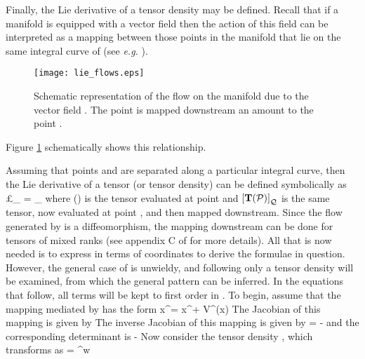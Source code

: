 Finally, the Lie derivative of a tensor density may be defined.
Recall that if a manifold is equipped with a vector field then the action of this
field can be interpreted as a mapping between those points in the manifold that
lie on the same integral curve of  (see \textit{e.g.} ).
\begin{figure}
\centerline{
   \texttt{[image: lie\_flows.eps]}}
   \caption{Schematic representation of the flow on the manifold \mM \nudge due to
   the vector field .  The point \mP \nudge is mapped downstream an amount
   \gl to the point \mQ.}\label{fig:D1}
\end{figure}
Figure \ref{fig:D1} schematically shows this relationship.

Assuming that points \mP \push and \mQ \push are separated along a particular integral curve,
then the Lie derivative of a tensor (or tensor density) can be defined symbolically
as
\be\label{eq:D12}
  \pounds_{}  = \lim_{\gl {}}
                            \frac
                              {}
                              {\gl} \eqc
\ee
where (\mQ) is the tensor evaluated at point \mQ \push and $\left[ {\mathbf{{T}}(\mathcal P)} \right]_{\mathcal Q}$
is the same tensor, now evaluated at point \mP, and then mapped downstream.
Since the flow generated by  is a diffeomorphism, the mapping downstream can be done
for tensors of mixed ranks (see appendix C of  for more details).
All that is now needed is to express  in terms of coordinates to derive
the formulae in question.
However, the general case of  is unwieldy, and following 
only a  tensor density will be examined, from which the general pattern
can be inferred.
In the equations that follow, all terms will be kept to first order in \gl.
To begin, assume that the mapping mediated by  has the form
\be
  {\tilde x}^\gm = x^\gm + \gl V^{\gm}(x) \eqp
\ee
The Jacobian of this mapping is given by
\be
  \Jac{\gtm}{\gn} \equiv {}
\ee
The inverse Jacobian of this mapping is given by
\be
  \jac{\gtn}{\gb} = \kd{\gn}{\gb} - \gl {} \eqc
\ee
and the corresponding determinant is
\be
  \mJ {} - \gl {} \eqp
\ee
Now consider the  tensor density \idx{\mT}{\up{\gm}\dn{\gn}},
which transforms as
\be
  \idx{\mT}{\up{\gtm}\dn{\gtn}} = \mJ^w \Jac{\gtm}{\ga} \jac{\gtn}{\gb}
                                  \idx{\mT}{\up{\ga}\dn{\gb}} \eqp
